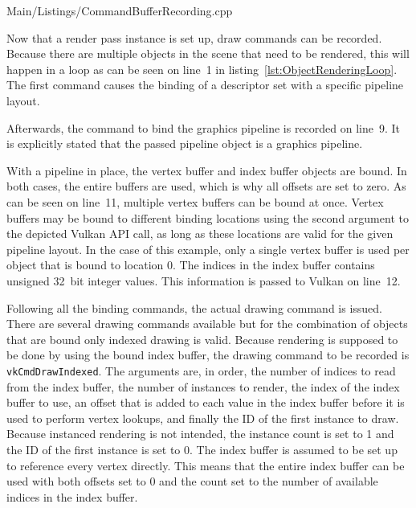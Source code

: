       
      {Main/Listings/CommandBufferRecording.cpp}

      Now that a render pass instance is set up, draw commands can be recorded.
      Because there are multiple objects in the scene that need to be rendered, this will happen in a loop as can be seen on line~1 in listing~\ref{lst:ObjectRenderingLoop}.
      The first command causes the binding of a descriptor set with a specific pipeline layout.

      Afterwards, the command to bind the graphics pipeline is recorded on line~9.
      It is explicitly stated that the passed pipeline object is a graphics pipeline.

      With a pipeline in place, the vertex buffer and index buffer objects are bound.
      In both cases, the entire buffers are used, which is why all offsets are set to zero.
      As can be seen on line~11, multiple vertex buffers can be bound at once.
      Vertex buffers may be bound to different binding locations using the second argument to the depicted Vulkan API call, as long as these locations are valid for the given pipeline layout.
      In the case of this example, only a single vertex buffer is used per object that is bound to location 0.
      The indices in the index buffer contains unsigned 32~bit integer values.
      This information is passed to Vulkan on line~12.

      Following all the binding commands, the actual drawing command is issued.
      There are several drawing commands available but for the combination of objects that are bound only indexed drawing is valid.
      Because rendering is supposed to be done by using the bound index buffer, the drawing command to be recorded is \lstinline{vkCmdDrawIndexed}.
      The arguments are, in order, the number of indices to read from the index buffer, the number of instances to render, the index of the index buffer to use, an offset that is added to each value in the index buffer before it is used to perform vertex lookups, and finally the ID of the first instance to draw.
      Because instanced rendering is not intended, the instance count is set to 1 and the ID of the first instance is set to 0.
      The index buffer is assumed to be set up to reference every vertex directly.
      This means that the entire index buffer can be used with both offsets set to 0 and the count set to the number of available indices in the index buffer.


